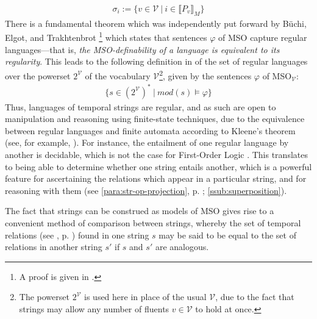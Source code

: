 \documentclass[a4paper,12pt,leqno]{article}
\renewcommand{\phi}{\varphi}
\newcommand{\selfnote}[1]{{\color{red}[NB\footnote{{\color{red}#1}}]}}
\newcommand{\nb}{\selfnote}
\begin{document}
\begin{align}
	\sigma_i := \{v \in \mathcal{V} ~|~ i \in \llbracket P_v \rrbracket_M \}
\end{align}
There is a fundamental theorem which was independently put forward by B\"{u}chi, Elgot, and Trakhtenbrot \cite[p. 30]{fernando2016regular}\footnote{A proof is given in \citet[p.124, Theorem 7.21]{Libkin2004}.} which states that sentences $\phi$ of MSO capture regular languages---that is, \textit{the MSO-definability of a language is equivalent to its regularity}. This leads to the following definition in \citet[p. 35]{Fernando2018} of the set of regular languages over the powerset $2^{\mathcal{V}}$ of the vocabulary $\mathcal{V}$\footnote{The powerset $2^{\mathcal{V}}$ is used here in place of the usual $\mathcal{V}$, due to the fact that strings may allow any number of fluents $v \in \mathcal{V}$ to hold at once.}, given by the sentences $\phi$ of MSO$_{\mathcal{V}}$:
\begin{align}
	\{s \in (2^{\mathcal{V}})^* ~|~ mod(s) \models \phi \}
\end{align}
Thus, languages of temporal strings are regular, and as such are open to manipulation and reasoning using finite-state techniques, due to the equivalence between regular languages and finite automata according to Kleene's theorem (see, for example, \citet[p. 41]{yu1997regular}). For instance, the entailment of one regular language by another is decidable, which is not the case for First-Order Logic \citep{elgot1966decidability}. This translates to being able to determine whether one string entails another, which is a powerful feature for ascertaining the relations which appear in a particular string, and for reasoning with them (see \cref{para:str-op-projection}, p. \pageref{para:str-op-projection}; \cref{ssub:superposition}).

The fact that strings can be construed as models of MSO gives rise to a convenient method of comparison between strings, whereby the set of temporal relations (see , p. \pageref{tab:allen-rels-strings}) found in one string $s$ may be said to be equal to the set of relations in another string $s'$ if $s$ and $s'$ are analogous.
\end{document}
